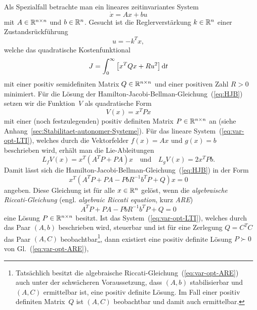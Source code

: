 Als Spezialfall betrachte man ein lineares zeitinvariantes System
\begin{equation}
\dot{x}=Ax+bu\label{eq:var-opt-LTI}
\end{equation}
mit $A\in{\mathbb{R}}^{n\times n}$ und $b\in{\mathbb{R}}^{n}$. Gesucht ist die Reglerverstärkung
$k\in{\mathbb{R}}^{n}$ einer Zustandsrückführung
\begin{equation}
u=-k^{T}x,\label{eq:opt-k}
\end{equation}
welche das quadratische Kostenfunktional
\begin{equation}
J=\int_{0}^{\infty}\left[x^{T}Qx+Ru^{2}\right]{\mathrm{d}} t\label{eq:opt-quadr-kosten}
\end{equation}
mit einer positiv semidefiniten Matrix $Q\in{\mathbb{R}}^{n\times n}$ und einer
positiven Zahl $R>0$ minimiert. Für die Lösung der Hamilton-Jacobi-Bellman-Gleichung~(\ref{eq:HJB})
setzen wir die Funktion~$V$ als quadratische Form 
\[
V(x)=x^{T}Px
\]
mit einer (noch festzulegenden) positiv definiten Matrix $P\in{\mathbb{R}}^{n\times n}$
an (siehe Anhang~\ref{sec:Stabilitaet-autonomer-Systeme}). Für das
lineare System~(\ref{eq:var-opt-LTI}), welches durch die Vektorfelder
$f(x)=Ax$ und $g(x)=b$ beschrieben wird, erhält man die Lie-Ableitungen
\begin{equation}
L_{f}V(x)=x^{T}\left(A^{T}P+PA\right)x\quad\text{und}\quad L_{g}V(x)=2x^{T}Pb.\label{eq:var-opt-Lf-Lg-V}
\end{equation}
Damit lässt sich die Hamilton-Jacobi-Bellman-Gleichung~(\ref{eq:HJB})
in der Form
\begin{equation}
x^{T}\left(A^{T}P+PA-PbR^{-1}b^{T}P+Q\right)x=0\label{eq:HJB-ARE}
\end{equation}
angeben. Diese Gleichung ist für alle $x\in{\mathbb{R}}^{n}$ gelöst, wenn die
\emph{algebraische Riccati-Gleichung} (engl.
\emph{algebraic Riccati equation}, kurz \emph{ARE}) 
\begin{equation}
A^{T}P+PA-PbR^{-1}b^{T}P+Q=0\label{eq:var-opt-ARE}
\end{equation}
eine Lösung $P\in{\mathbb{R}}^{n\times n}$ besitzt. Ist das System~(\ref{eq:var-opt-LTI}),
welches durch das Paar $(A,b)$ beschrieben wird, steuerbar und ist
für eine Zerlegung $Q=C^{T}C$ das Paar $(A,C)$ beobachtbar\footnote{Tatsächlich besitzt die algebraische Riccati-Gleichung~(\ref{eq:var-opt-ARE})
auch unter der schwächeren Voraussetzung, dass $(A,b)$ stabilisierbar
und $(A,C)$ ermittelbar ist, eine positiv definite
Lösung. Im Fall einer positiv definiten Matrix~$Q$ ist $(A,C)$
beobachtbar und damit auch ermittelbar.}, dann existiert eine positiv definite Lösung $P\succ0$ von Gl.~(\ref{eq:var-opt-ARE}),

